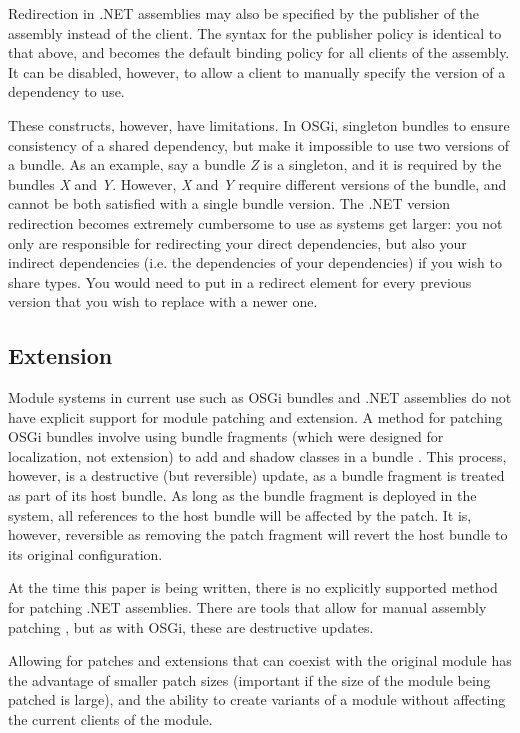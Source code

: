 Redirection in .NET assemblies may also be specified by the publisher of the
assembly instead of the client. The syntax for the publisher policy is identical
to that above, and becomes the default binding policy for all clients of the assembly.
It can be disabled, however, to allow a client to manually specify the version of
a dependency to use.

These constructs, however, have limitations. In OSGi, singleton bundles to ensure
consistency of a shared dependency, but make it impossible to use two versions of
a bundle. As an example, say a bundle \textit{Z} is a singleton, and it is required
by the bundles \textit{X} and \textit{Y}. However, \textit{X} and \textit{Y} require 
different versions of the bundle, and cannot be both satisfied with a single bundle version.
The .NET version redirection becomes extremely cumbersome to use as systems get larger: you
not only are responsible for redirecting your direct dependencies, but also your indirect
dependencies (i.e. the dependencies of your dependencies) if you wish to share types. You
would need to put in a redirect element for every previous version that you wish to replace
with a newer one.

\subsection{Extension}

Module systems in current use such as OSGi bundles and .NET assemblies do not 
have explicit support for module patching and extension. A method for patching OSGi bundles
involve using bundle fragments (which were designed for localization, not extension)
to add and shadow classes in a bundle \cite{patchingosgi}. This process, however, is
a destructive (but reversible) update, as a bundle fragment is treated as part of its 
host bundle. As long as the bundle fragment is deployed in the system, all references 
to the host bundle will be affected by the patch. It is, however, reversible as 
removing the patch fragment will revert the host bundle to its original configuration.

At the time this paper is being written, there is no explicitly supported method for
patching .NET assemblies. There are tools that allow for manual assembly patching 
\cite{reflexil, monocecil}, but as with OSGi, these are destructive updates.

Allowing for patches and extensions that can coexist with the original module has the
advantage of smaller patch sizes (important if the size of the module being patched is
large), and the ability to create variants of a module without affecting the current
clients of the module.

